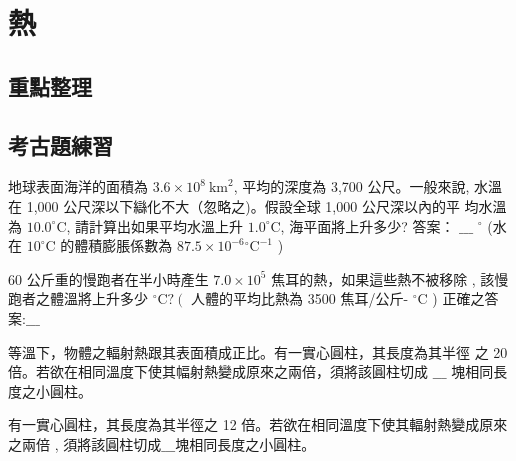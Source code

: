\documentclass[cn,10pt,math=newtx,chinesefont=founder]{../elegantbook}
\begin{document}
\section{熱}
\subsection{重點整理}
\newpage
\subsection{考古題練習}
\begin{example}
    地球表面海洋的面積為 $3.6 \times 10^{8} \mathrm{~km}^{2}$, 平均的深度為 3,700 公尺。一般來說, 水溫在 1,000 公尺深以下䜌化不大（忽略之)。假設全球 1,000 公尺深以內的平 均水溫為 $10.0^{\circ} \mathrm{C}$, 請計算出如果平均水溫上升 $1.0^{\circ} \mathrm{C}$, 海平面將上升多少?
    答案： $\_\_\_$ $^{\circ}$ (水在 $10^{\circ} \mathrm{C}$ 的體積膨脹係數為 $87.5 \times 10^{-6}{ }^{\circ} \mathrm{C}^{-1}$ )
\end{example}
\begin{solution}

\end{solution}
\vspace{6cm}
\begin{example}
    60 公斤重的慢跑者在半小時產生 $7.0 \times 10^{5}$ 焦耳的熱，如果這些熱不被移除 , 該慢跑者之體溫將上升多少 ${ }^{\circ} \mathrm{C} ?\left(\right.$ 人體的平均比熱為 3500 焦耳/公斤- ${ }^{\circ} \mathrm{C}$ ) 正確之答案:$\_\_\_$

\end{example}
\begin{solution}

\end{solution}
\vspace{6cm}

\begin{example}
    等溫下，物體之輻射熱跟其表面積成正比。有一實心圓柱，其長度為其半徑 之 20 倍。若欲在相同溫度下使其幅射熱變成原來之兩倍，須將該圓柱切成 $\_\_\_$ 塊相同長度之小圓柱。
\end{example}
\begin{solution}

\end{solution}
\vspace{6cm}

\begin{example}
    有一實心圓柱，其長度為其半徑之 12 倍。若欲在相同溫度下使其輻射熱變成原來之兩倍 , 須將該圓柱切成$\_\_\_$塊相同長度之小圓柱。
\end{example}
\begin{solution}
    
\end{solution}
\vspace{6cm}
\end{document}

